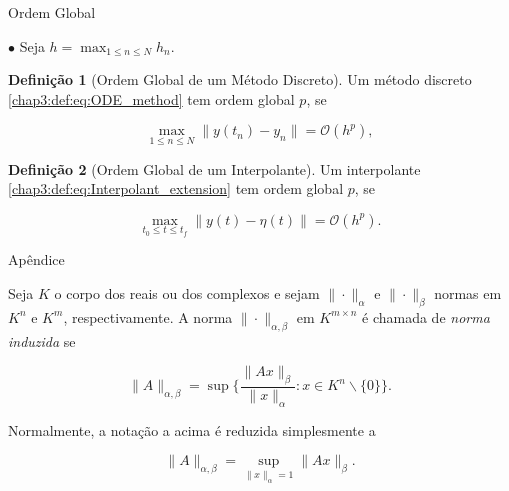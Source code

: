 \documentclass{beamer}
\theoremstyle{plain}
\theoremstyle{definition}
\newtheorem{defi}{Definição}
\begin{document}
\begin{frame}{Ordem Global}

    \phantom{aa} $\bullet$ Seja $h = \max_{1 \leq n \leq N} h_n$.

    \begin{defi}[Ordem Global de um Método Discreto]
        
        Um método discreto \eqref{chap3:def:eq:ODE_method} tem ordem global $p$, se 

        \begin{equation}
            \max_{1 \leq n \leq N} \| y(t_n) - y_n \| = \mathcal{O}(h^p),
        \end{equation}
    \end{defi}


    \begin{defi}[Ordem Global de um Interpolante]
        
        Um interpolante \eqref{chap3:def:eq:Interpolant_extension} tem ordem global $p$, se 

        \begin{equation}
            \max_{t_0 \leq t \leq t_f} \| y(t) - \eta(t) \| = \mathcal{O}(h^{p}).
        \end{equation}
    \end{defi}

\end{frame}

\begin{frame}{Apêndice}
    \begin{definition}
        \label{apendices:def:induced_matrix_norm}
        Seja $K$ o corpo dos reais ou dos complexos e sejam $\|\cdot\|_\alpha$ e $\|\cdot\|_\beta$ normas em $K^n$ e $K^m$, respectivamente.
        A norma $\| \cdot \|_{\alpha, \beta}$ em $K^{m \times n}$ é chamada de \textit{norma induzida} se 

        \noindent
        \[ \| A \|_{\alpha, \beta} = \sup\{\frac{\|Ax\|_\beta}{\|x\|_\alpha} : x\in K^n \backslash \{0\} \}. \]


        Normalmente, a notação a acima é reduzida simplesmente a 

        \noindent
        \[ \| A \|_{\alpha, \beta} = \sup_{\|x\|_\alpha = 1} \|Ax\|_\beta.\]

    \end{definition}


\end{frame}
\end{document}
